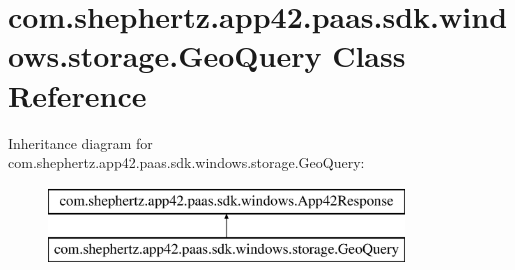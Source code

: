 \hypertarget{classcom_1_1shephertz_1_1app42_1_1paas_1_1sdk_1_1windows_1_1storage_1_1_geo_query}{\section{com.\+shephertz.\+app42.\+paas.\+sdk.\+windows.\+storage.\+Geo\+Query Class Reference}
\label{classcom_1_1shephertz_1_1app42_1_1paas_1_1sdk_1_1windows_1_1storage_1_1_geo_query}
}
Inheritance diagram for com.\+shephertz.\+app42.\+paas.\+sdk.\+windows.\+storage.\+Geo\+Query\+:\begin{figure}[H]
\begin{center}
\leavevmode
\includegraphics[height=2.000000cm]{classcom_1_1shephertz_1_1app42_1_1paas_1_1sdk_1_1windows_1_1storage_1_1_geo_query}
\end{center}
\end{figure}
